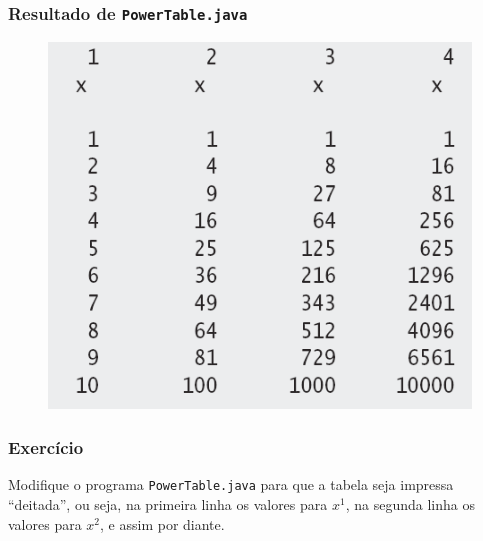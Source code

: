 \documentclass[xcolor={dvipsnames,table},aspectratio=169]{beamer}
\begin{document}
\begin{frame}\frametitle{Resultado de \texttt{PowerTable.java}}
\begin{figure}[h]
	\includegraphics[height=0.65\paperheight,center]{pucrs-ep-fprog-unidade_04-lacos-laminas-resultado_de_powertable.png}
\end{figure}
\end{frame}

\begin{frame}[fragile]\frametitle{Exercício}
Modifique o programa \texttt{PowerTable.java} para que a tabela seja impressa ``deitada'', ou seja, na primeira linha os valores para $x^1$, na segunda linha os valores para $x^2$, e assim por diante.
\end{frame}
\end{document}
